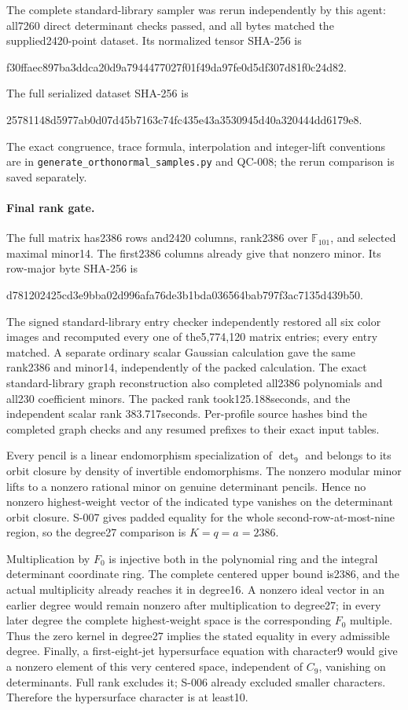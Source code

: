 The complete standard-library sampler was rerun independently by this
agent: all7260 direct determinant checks passed, and all bytes matched
the supplied2420-point dataset.  Its normalized tensor SHA-256 is
\begin{center}\small\ttfamily
f30ffaec897ba3ddca20d9a7944477027f01f49da97fe0d5df307d81f0c24d82.
\end{center}
The full serialized dataset SHA-256 is
\begin{center}\small\ttfamily
25781148d5977ab0d07d45b7163c74fc435e43a3530945d40a320444dd6179e8.
\end{center}
The exact congruence, trace formula, interpolation and integer-lift
conventions are in \texttt{generate\_orthonormal\_samples.py} and
QC-008; the rerun comparison is saved separately.

\paragraph{Final rank gate.}
The full matrix has2386 rows and2420 columns, rank2386 over
$\mathbb F_{101}$, and selected maximal minor14.  The first2386
columns already give that nonzero minor.  Its row-major byte SHA-256 is
\begin{center}\small\ttfamily
d781202425cd3e9bba02d996afa76de3b1bda036564bab797f3ac7135d439b50.
\end{center}
The signed standard-library entry checker independently restored all
six color images and recomputed every one of the5,774,120 matrix
entries; every entry matched.  A separate ordinary scalar Gaussian
calculation gave the same rank2386 and minor14, independently of the
packed calculation.  The exact standard-library graph reconstruction
also completed all2386 polynomials and all230 coefficient minors.
The packed rank took125.188seconds, and the independent scalar rank
383.717seconds.  Per-profile source hashes bind the completed graph
checks and any resumed prefixes to their exact input tables.

Every pencil is a linear endomorphism specialization of $\det_9$ and
belongs to its orbit closure by density of invertible endomorphisms.
The nonzero modular minor lifts to a nonzero rational
minor on genuine determinant pencils.  Hence no nonzero highest-weight
vector of the indicated type vanishes on the determinant orbit closure.
S-007 gives padded equality for the whole second-row-at-most-nine
region, so the degree27 comparison is $K=q=a=2386$.

Multiplication by $F_0$ is injective both in the polynomial ring and
the integral determinant coordinate ring.  The complete centered upper
bound is2386, and the actual multiplicity already reaches it in
degree16.  A nonzero ideal vector in an earlier degree would remain
nonzero after multiplication to degree27; in every later degree the
complete highest-weight space is the corresponding $F_0$ multiple.
Thus the zero kernel in degree27 implies the stated equality in every
admissible degree.  Finally, a first-eight-jet hypersurface equation
with character9 would give a nonzero element of this very centered
space, independent of $C_9$, vanishing on determinants.  Full rank
excludes it; S-006 already excluded smaller characters.  Therefore
the hypersurface character is at least10.

